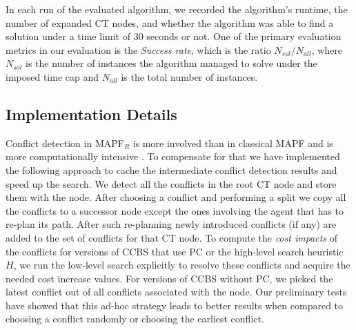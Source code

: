 \documentclass[letterpaper]{article} %
\newcommand\roni[1]{\nb{\textbf{Roni:}}{orange}{#1}}
\newcommand{\ccbs}{\ac{CCBS}\xspace}
\newcommand{\ct}{\ac{CT}\xspace}
\newcommand{\mapfr}{{MAPF}$_R$\xspace}
\newcommand{\mapf}{\ac{MAPF}\xspace}
\newcommand{\pc}{\ac{PC}\xspace}
\begin{document}
In each run of the evaluated algorithm, we recorded the algorithm's runtime, the number of expanded \ct nodes, and whether the algorithm was able to find a solution under a time limit of 30 seconds or not.
One of the primary evaluation metrics in our evaluation is the \emph{Success rate}, which is the ratio $N_{sol}/N_{all}$, where $N_{sol}$ is the number of instances the algorithm managed to solve under the imposed time cap and $N_{all}$ is the total number of instances.





\subsection{Implementation Details}

Conflict detection in \mapfr is more involved than in classical \mapf and is more computationally intensive%
.
To compensate for that we have implemented the following approach to cache the intermediate conflict detection results and speed up the search.
We detect all the conflicts in the root \ct node and store them with the node.
After choosing a conflict and performing a split we copy all the conflicts to a successor node except the ones involving the agent that has to re-plan its path.
After such re-planning newly introduced conflicts (if any) are added to the set of conflicts for that \ct node.
To compute the \emph{cost impacts} of the conflicts for versions of \ccbs that use \pc or the high-level search heuristic $H$, we run the low-level search explicitly to resolve these conflicts and acquire the needed cost increase values. For versions of \ccbs without \pc, we picked the latest conflict out of all conflicts associated with the node. Our preliminary tests have showed that this ad-hoc strategy leads to better results when compared to choosing a conflict randomly or choosing the earliest conflict.
\end{document}
